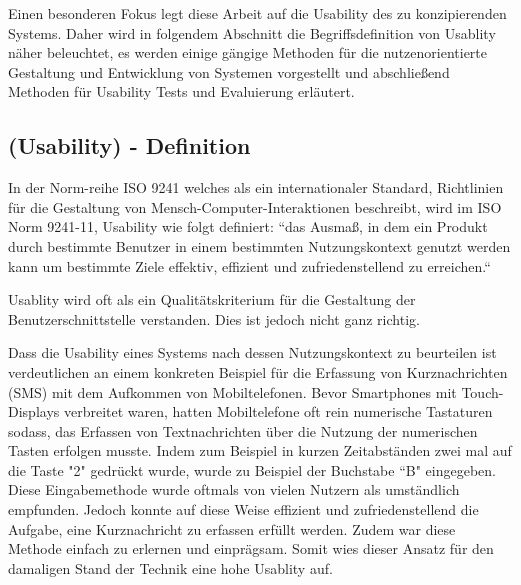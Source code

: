 Einen besonderen Fokus legt diese Arbeit auf die Usability des zu konzipierenden Systems. Daher wird in folgendem Abschnitt die Begriffsdefinition von Usablity näher beleuchtet, es werden einige 
gängige Methoden für die nutzenorientierte Gestaltung und Entwicklung von Systemen vorgestellt und abschließend Methoden für Usability Tests und Evaluierung erläutert. 

\subsection{(Usability) - Definition} \label{UsaDef}

In der Norm-reihe ISO 9241 welches als ein internationaler Standard, Richtlinien für die Gestaltung von Mensch-Computer-Interaktionen beschreibt, wird im ISO Norm 9241-11,  Usability wie folgt definiert:
``das Ausmaß, in dem ein Produkt durch bestimmte Benutzer in einem bestimmten Nutzungskontext genutzt werden kann um bestimmte Ziele effektiv, effizient und zufriedenstellend zu erreichen.``

\cite{MichaelRichter2016; MaryBethRossonJohnM.CarrollDianeD.Cerra2002} Usablity wird  oft als ein Qualitätskriterium für die Gestaltung der Benutzerschnittstelle verstanden. Dies ist jedoch nicht ganz richtig.

Dass die Usability eines Systems nach dessen Nutzungskontext zu beurteilen ist verdeutlichen \cite{MichaelRichter2016} an einem konkreten Beispiel für die Erfassung 
von Kurznachrichten (SMS) mit dem Aufkommen von Mobiltelefonen.  Bevor Smartphones mit Touch-Displays verbreitet waren, hatten Mobiltelefone oft rein numerische Tastaturen sodass, das Erfassen 
von Textnachrichten über die Nutzung der numerischen Tasten erfolgen musste. Indem zum Beispiel in kurzen Zeitabständen zwei mal auf die Taste "2" gedrückt wurde, wurde zu Beispiel der Buchstabe 
``B" eingegeben. Diese Eingabemethode wurde oftmals von vielen Nutzern als umständlich empfunden. Jedoch konnte auf diese Weise effizient und zufriedenstellend die Aufgabe, eine Kurznachricht 
zu erfassen erfüllt werden. Zudem war diese Methode einfach zu erlernen und einprägsam. Somit wies dieser Ansatz für den damaligen Stand der Technik eine hohe Usablity auf. 

